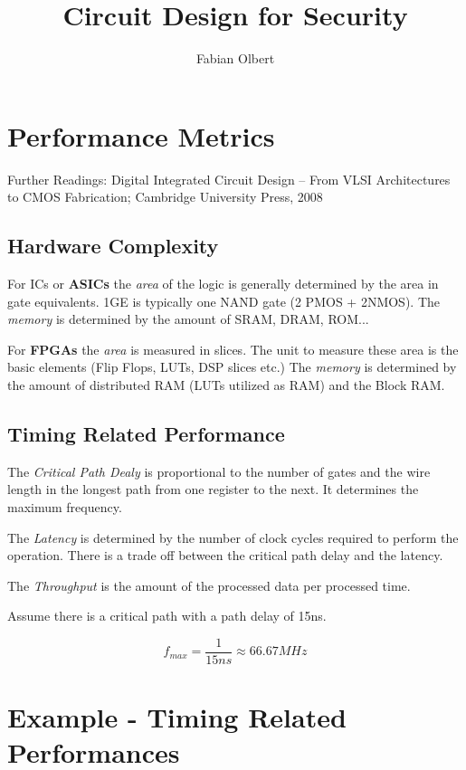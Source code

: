 \documentclass{article}
\title{Circuit Design for Security}
\author{Fabian Olbert}
\begin{document}
\maketitle
  
\section{Performance Metrics}

Further Readings: Digital Integrated Circuit Design – From VLSI Architectures to CMOS Fabrication; Cambridge University Press, 2008

\subsection{Hardware Complexity}
For ICs or \textbf{ASICs} the \textit{area} of the logic is generally determined by the area in gate equivalents. 
1GE is typically one NAND gate (2 PMOS + 2NMOS). 
The \textit{memory} is determined by the amount of SRAM, DRAM, ROM...

For \textbf{FPGAs} the \textit{area} is measured in slices. The unit to measure these area is the basic elements (Flip Flops, LUTs, DSP slices etc.)
The \textit{memory} is determined by the amount of distributed RAM (LUTs utilized as RAM) and the Block RAM.

\subsection{Timing Related Performance}
The \textit{Critical Path Dealy} is proportional to the number of gates and the wire length in the longest path from one register to the next. It determines the maximum frequency.

The \textit{Latency} is determined by the number of clock cycles required to perform the operation. There is a trade off between the critical path delay and the latency. 

The \textit{Throughput} is the amount of the processed data per processed time.

Assume there is a critical path with a path delay of 15ns. 

\begin{equation}
  
  f_{max} = \frac{1}{15ns} \approx 66.67MHz
\label{eq:freq}
\end{equation}

\section*{Example - Timing Related Performances}
\end{document}
